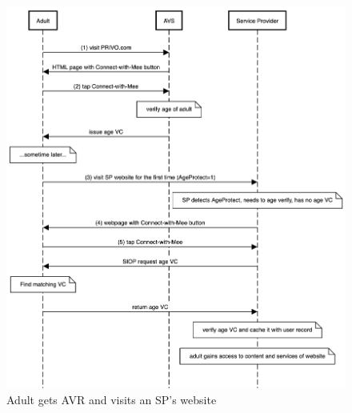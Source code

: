 \documentclass[11pt, oneside]{article}   	%
\begin{document}
\begin{figure}
	\includegraphics[width=\textwidth]{./images/adult-sequence.png}
	\caption{Adult gets AVR and visits an SP's website}
	\label{fig:adult-seq}
\end{figure}

\end{document}
